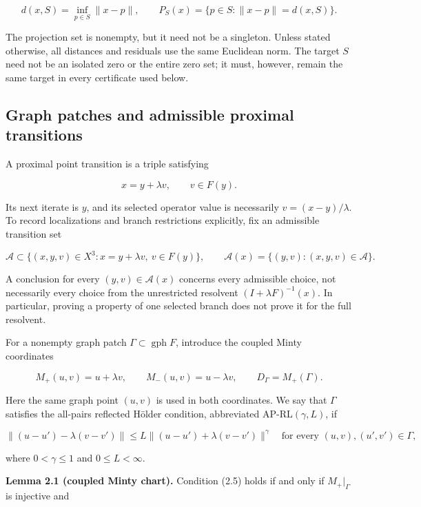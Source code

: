 \documentclass[11pt,a4paper]{article}
\theoremstyle{plain}
\theoremstyle{definition}
\theoremstyle{remark}
\begin{document}
\[
d(x,S)=\inf_{p\in S}\|x-p\|,
\qquad
P_S(x)=\{p\in S:\|x-p\|=d(x,S)\}.
\tag{2.1}
\]

The projection set is nonempty, but it need not be a singleton. Unless
stated otherwise, all distances and residuals use the same Euclidean
norm. The target \(S\) need not be an isolated zero or the entire zero
set; it must, however, remain the same target in every certificate used
below.

\hypertarget{graph-patches-and-admissible-proximal-transitions}{%
\subsection{Graph patches and admissible proximal
transitions}\label{graph-patches-and-admissible-proximal-transitions}}

A proximal point transition is a triple satisfying

\[
x=y+\lambda v,\qquad v\in F(y).
\tag{2.2}
\]

Its next iterate is \(y\), and its selected operator value is
necessarily \(v=(x-y)/\lambda\). To record localizations and branch
restrictions explicitly, fix an admissible transition set

\[
\mathcal A\subset
\{(x,y,v)\in X^3:x=y+\lambda v,\ v\in F(y)\},
\qquad
\mathcal A(x)=\{(y,v):(x,y,v)\in\mathcal A\}.
\tag{2.3}
\]

A conclusion for every \((y,v)\in\mathcal A(x)\) concerns every
admissible choice, not necessarily every choice from the unrestricted
resolvent \((I+\lambda F)^{-1}(x)\). In particular, proving a property
of one selected branch does not prove it for the full resolvent.

For a nonempty graph patch \(\Gamma\subset\operatorname{gph}F\),
introduce the coupled Minty coordinates

\[
M_+(u,v)=u+\lambda v,
\qquad
M_-(u,v)=u-\lambda v,
\qquad
D_\Gamma=M_+(\Gamma).
\tag{2.4}
\]

Here the same graph point \((u,v)\) is used in both coordinates. We say
that \(\Gamma\) satisfies the all-pairs reflected Hölder condition,
abbreviated AP-RL\((\gamma,L)\), if

\[
\|(u-u')-\lambda(v-v')\|
\le L\|(u-u')+\lambda(v-v')\|^\gamma
\quad
\text{for every }(u,v),(u',v')\in\Gamma,
\tag{2.5}
\]

where \(0<\gamma\le1\) and \(0\le L<\infty\).

\textbf{Lemma 2.1 (coupled Minty chart).} Condition (2.5) holds if and
only if \(M_+|_\Gamma\) is injective and
\end{document}
